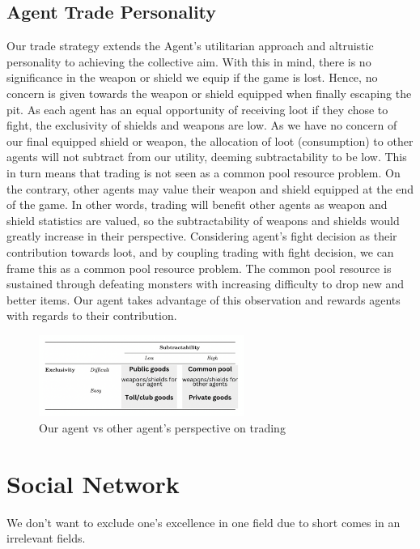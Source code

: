 \subsection{Agent Trade Personality}

\noindent Our trade strategy extends the Agent’s utilitarian approach and altruistic personality to achieving the collective aim. With this in mind, there is no significance in the weapon or shield we equip if the game is lost. Hence, no concern is given towards the weapon or shield equipped when finally escaping the pit. As each agent has an equal opportunity of receiving loot if they chose to fight, the exclusivity of shields and weapons are low. As we have no concern of our final equipped shield or weapon, the allocation of loot (consumption) to other agents will not subtract from our utility, deeming subtractability to be low. This in turn means that trading is not seen as a common pool resource problem.
\noindent On the contrary, other agents may value their weapon and shield equipped at the end of the game. In other words, trading will benefit other agents as weapon and shield statistics are valued, so the subtractability of weapons and shields would greatly increase in their perspective.
Considering agent’s fight decision as their contribution towards loot, and by coupling trading with fight decision, we can frame this as a common pool resource problem. The common pool resource is sustained through defeating monsters with increasing difficulty to drop new and better items. Our agent takes advantage of this observation and rewards agents with regards to their contribution.

\begin{figure}[htb]
    \centering
    \includegraphics[width=0.60\textwidth]{008_team_5_agent_design/images/13.png}
    \caption{Our agent vs other agent's perspective on trading}
    \label{13}
\end{figure}


\section{Social Network}

We don't want to exclude one's excellence in one field due to short comes in an irrelevant fields.

